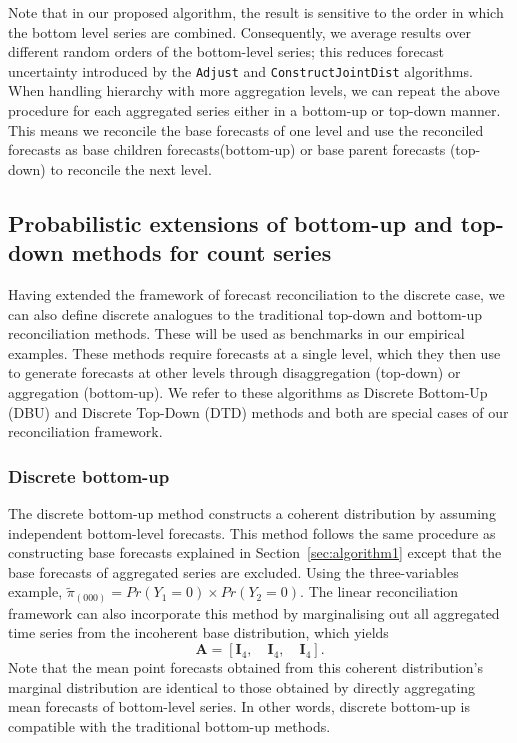 \documentclass[a4paper,review,12pt,authoryear]{elsarticle}
\let\code=\texttt
\theoremstyle{definition}
\begin{document}
  Note that in our proposed algorithm, the result is sensitive to the order in which the bottom level series are combined. Consequently, we average results over different random orders of the bottom-level series; this reduces forecast uncertainty introduced by the \code{Adjust} and \code{ConstructJointDist} algorithms.
  When handling hierarchy with more aggregation levels, we can repeat the above procedure for each aggregated series either in a bottom-up or top-down manner. This means we reconcile the base forecasts of one level and use the reconciled forecasts as base children forecasts(bottom-up) or base parent forecasts (top-down) to reconcile the next level.



    \subsection{Probabilistic extensions of bottom-up and top-down methods for count series}

    Having extended the framework of forecast reconciliation to the discrete case, we can also define discrete analogues to the traditional top-down and bottom-up reconciliation methods. These will be used as benchmarks in our empirical examples. These methods require forecasts at a single level, which they then use to generate forecasts at other levels through disaggregation (top-down) or aggregation (bottom-up).
    We refer to these algorithms as Discrete Bottom-Up (DBU) and Discrete Top-Down (DTD) methods and both are special cases of our reconciliation framework. 
    
    \subsubsection*{\textbf{Discrete bottom-up}}
    \label{sec:bottomup}

    The discrete bottom-up method constructs a coherent distribution by assuming independent bottom-level forecasts.
    This method follows the same procedure as constructing base forecasts explained in Section~\ref{sec:algorithm1} except that the base forecasts of aggregated series are excluded.
    Using the three-variables example, $\tilde{\pi}_{(000)} = Pr(Y_1=0)\times Pr(Y_2=0)$.
    The linear reconciliation framework can also incorporate this method by marginalising out all aggregated time series from the incoherent base distribution, which yields \[
    \mathbf{A} = [\mathbf{I}_4, \quad \mathbf{I}_4, \quad \mathbf{I}_4 ].
    \]
    Note that the mean point forecasts obtained from this coherent distribution's marginal distribution are identical to those obtained by directly aggregating mean forecasts of bottom-level series.
    In other words, discrete bottom-up is compatible with the traditional bottom-up methods.
\end{document}
